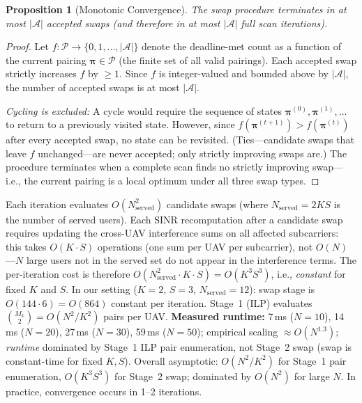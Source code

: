 \documentclass[journal]{IEEEtran}
\newtheorem{proposition}{Proposition}
\begin{document}
\begin{proposition}[Monotonic Convergence]
\label{prop:converge}
The swap procedure terminates in at most $|\mathcal{A}|$ accepted swaps (and therefore in at most $|\mathcal{A}|$ full scan iterations).
\end{proposition}
\begin{proof}
Let $f: \mathcal{P} \to \{0,1,\ldots,|\mathcal{A}|\}$ denote the deadline-met count as a function of the current pairing $\boldsymbol{\pi} \in \mathcal{P}$ (the finite set of all valid pairings).
Each accepted swap strictly increases $f$ by $\geq 1$.
Since $f$ is integer-valued and bounded above by $|\mathcal{A}|$, the number of accepted swaps is at most $|\mathcal{A}|$.

\emph{Cycling is excluded:}
A cycle would require the sequence of states $\boldsymbol{\pi}^{(0)}, \boldsymbol{\pi}^{(1)}, \ldots$ to return to a previously visited state.
However, since $f(\boldsymbol{\pi}^{(t+1)}) > f(\boldsymbol{\pi}^{(t)})$ after every accepted swap, no state can be revisited.
(Ties---candidate swaps that leave $f$ unchanged---are never accepted; only strictly improving swaps are.)
The procedure terminates when a complete scan finds no strictly improving swap---i.e., the current pairing is a local optimum under all three swap types.
\end{proof}

Each iteration evaluates $O(N_{\text{served}}^2)$ candidate swaps (where $N_{\text{served}} = 2KS$ is the number of served users).
Each SINR recomputation after a candidate swap requires updating the cross-UAV interference sums on all affected subcarriers: this takes $O(K \cdot S)$ operations (one sum per UAV per subcarrier), not $O(N)$---$N$ large users not in the served set do not appear in the interference terms.
The per-iteration cost is therefore $O(N_{\text{served}}^2 \cdot K \cdot S) = O(K^3 S^3)$, i.e., \emph{constant} for fixed $K$ and $S$.
In our setting ($K=2$, $S=3$, $N_{\text{served}}=12$): swap stage is $O(144 \cdot 6) = O(864)$ constant per iteration.
Stage~1 (ILP) evaluates $\binom{M_k}{2} = O(N^2/K^2)$ pairs per UAV.
\textbf{Measured runtime:} 7\,ms ($N=10$), 14\,ms ($N=20$), 27\,ms ($N=30$), 59\,ms ($N=50$); empirical scaling $\approx O(N^{1.3})$; \emph{runtime} dominated by Stage~1 ILP pair enumeration, not Stage~2 swap (swap is constant-time for fixed $K,S$).
Overall asymptotic: $O(N^2/K^2)$ for Stage~1 pair enumeration, $O(K^3S^3)$ for Stage~2 swap; dominated by $O(N^2)$ for large $N$.
In practice, convergence occurs in 1--2 iterations.
\end{document}
